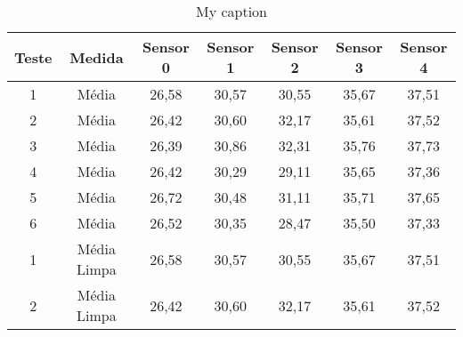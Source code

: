\begin{table}[]
\centering
\caption{My caption}
\label{my-label}
\begin{tabular}{|c|c|ccccc|}
\hline
\textbf{Teste}            & \textbf{Medida}                                                            & \textbf{Sensor 0}         & \textbf{Sensor 1}         & \textbf{Sensor 2}         & \textbf{Sensor 3}         & \textbf{Sensor 4}          \\ \hline
1                         & Média                                                                      & 26,58                     & 30,57                     & 30,55                     & 35,67                     & 37,51                      \\
2                         & Média                                                                      & 26,42                     & 30,60                     & 32,17                     & 35,61                     & 37,52                      \\
3                         & Média                                                                      & 26,39                     & 30,86                     & 32,31                     & 35,76                     & 37,73                      \\
4                         & Média                                                                      & 26,42                     & 30,29                     & 29,11                     & 35,65                     & 37,36                      \\
5                         & Média                                                                      & 26,72                     & 30,48                     & 31,11                     & 35,71                     & 37,65                      \\
6                         & Média                                                                      & 26,52                     & 30,35                     & 28,47                     & 35,50                     & 37,33                      \\ \hline
1                         & Média Limpa                                                                & 26,58                     & 30,57                     & 30,55                     & 35,67                     & 37,51                      \\
2                         & Média Limpa                                                                & 26,42                     & 30,60                     & 32,17                     & 35,61                     & 37,52                      \\

\end{tabular}
\end{table}
